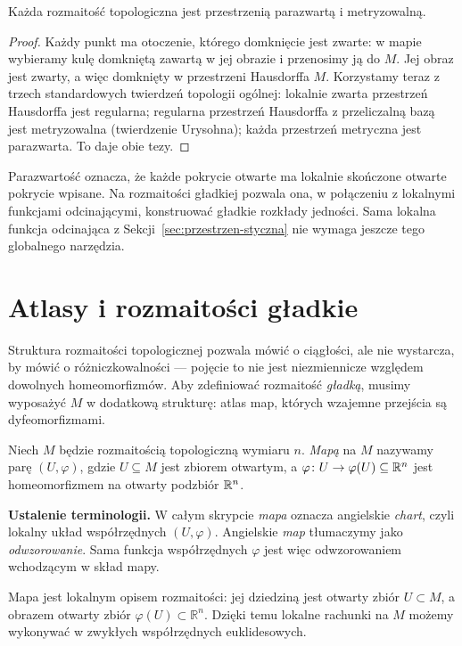 \begin{fakt}
Każda rozmaitość topologiczna jest przestrzenią parazwartą i metryzowalną.
\end{fakt}

\begin{proof}
Każdy punkt ma otoczenie, którego domknięcie jest zwarte: w mapie
wybieramy kulę domkniętą zawartą w jej obrazie i przenosimy ją do $M$.
Jej obraz jest zwarty, a więc domknięty w przestrzeni Hausdorffa $M$.
Korzystamy teraz z trzech standardowych twierdzeń topologii ogólnej:
lokalnie zwarta przestrzeń Hausdorffa jest regularna;
regularna przestrzeń Hausdorffa z przeliczalną bazą jest metryzowalna
(twierdzenie Urysohna); każda przestrzeń metryczna jest parazwarta.
To daje obie tezy.
\end{proof}
Parazwartość oznacza, że każde pokrycie otwarte ma lokalnie skończone
otwarte pokrycie wpisane. Na rozmaitości gładkiej pozwala ona,
w połączeniu z lokalnymi funkcjami odcinającymi, konstruować gładkie
rozkłady jedności. Sama lokalna funkcja odcinająca z
Sekcji~\ref{sec:przestrzen-styczna} nie wymaga jeszcze tego globalnego narzędzia.

\section{Atlasy i rozmaitości gładkie}\label{sec:atlas}

Struktura rozmaitości topologicznej pozwala mówić o ciągłości, ale nie wystarcza, by mówić
o różniczkowalności — pojęcie to nie jest niezmiennicze względem dowolnych homeomorfizmów.
Aby zdefiniować rozmaitość \emph{gładką}, musimy wyposażyć $M$ w dodatkową strukturę: atlas
map, których wzajemne przejścia są dyfeomorfizmami.

\begin{definicja}
Niech $M$ będzie rozmaitością topologiczną wymiaru $n$. \emph{Mapą} na $M$
nazywamy parę $(U,\varphi)$, gdzie $U\subseteq M$ jest zbiorem otwartym, a
$\varphi\colon U\to\varphi(U)\subseteq\mathbb{R}^n$ jest homeomorfizmem na otwarty podzbiór $\mathbb{R}^n$.
\end{definicja}

\noindent\textbf{Ustalenie terminologii.}
W całym skrypcie \emph{mapa} oznacza angielskie \emph{chart},
czyli lokalny układ współrzędnych $(U,\varphi)$.
Angielskie \emph{map} tłumaczymy jako \emph{odwzorowanie}.
Sama funkcja współrzędnych $\varphi$ jest więc odwzorowaniem
wchodzącym w skład mapy.

\begin{uwaga}
Mapa jest lokalnym opisem rozmaitości: jej dziedziną jest otwarty zbiór $U\subset M$,
a obrazem otwarty zbiór $\varphi(U)\subset\mathbb R^n$. Dzięki temu lokalne rachunki na $M$
możemy wykonywać w zwykłych współrzędnych euklidesowych.
\end{uwaga}

